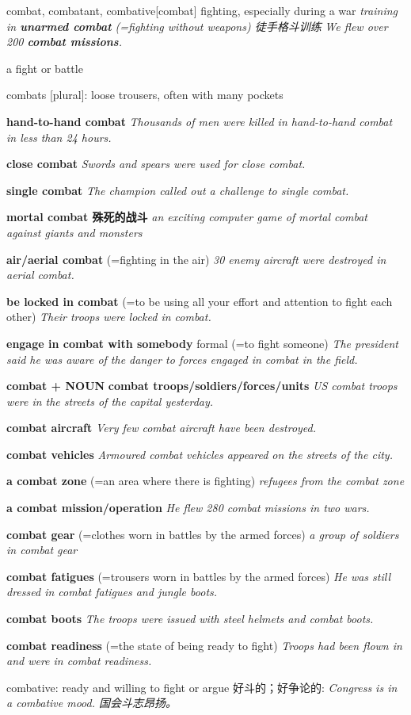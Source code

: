 \begin{DefWord}{combat, combatant, combative}[combat]
    fighting, especially during a war
    \textit{training in \textbf{unarmed combat} (=fighting without weapons) 徒手格斗训练}
    \textit{We flew over 200 \textbf{combat missions}.}

    a fight or battle

    combats [plural]: loose trousers, often with many pockets

    \textbf{hand-to-hand combat}
    \textit{Thousands of men were killed in hand-to-hand combat in less than 24 hours.}

    \textbf{close combat}
    \textit{Swords and spears were used for close combat.}

    \textbf{single combat}
    \textit{The champion called out a challenge to single combat.}

    \textbf{mortal combat 殊死的战斗}
    \textit{an exciting computer game of mortal combat against giants and monsters}

    \textbf{air/aerial combat}
    (=fighting in the air)
\textit{30 enemy aircraft were destroyed in aerial combat.}

\textbf{be locked in combat}
(=to be using all your effort and attention to fight each other)
\textit{Their troops were locked in combat.}

\textbf{engage in combat with somebody}
formal (=to fight someone)
\textit{The president said he was aware of the danger to forces engaged in combat in the field.}

\textbf{combat + NOUN}
\textbf{combat troops/soldiers/forces/units}
\textit{US combat troops were in the streets of the capital yesterday.}

\textbf{combat aircraft}
\textit{Very few combat aircraft have been destroyed.}

\textbf{combat vehicles}
\textit{Armoured combat vehicles appeared on the streets of the city.}

\textbf{a combat zone}
(=an area where there is fighting)
\textit{refugees from the combat zone}

\textbf{a combat mission/operation}
\textit{He flew 280 combat missions in two wars.}

\textbf{combat gear}
(=clothes worn in battles by the armed forces)
\textit{a group of soldiers in combat gear}

\textbf{combat fatigues}
(=trousers worn in battles by the armed forces)
\textit{He was still dressed in combat fatigues and jungle boots.}

\textbf{combat boots}
\textit{The troops were issued with steel helmets and combat boots.}

\textbf{combat readiness}
(=the state of being ready to fight)
\textit{Troops had been flown in and were in combat readiness.}

combative: ready and willing to fight or argue 好斗的；好争论的:
\textit{ Congress is in a combative mood. 国会斗志昂扬。}

\end{DefWord}

